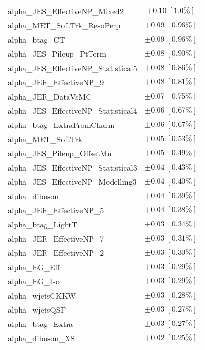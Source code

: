 \begin{table}
\begin{center}
\begin{tabular*}{\textwidth}{@{\extracolsep{\fill}}lc}
alpha\_JES\_EffectiveNP\_Mixed2         & $\pm 0.10\ [1.0\%] $       \\
alpha\_MET\_SoftTrk\_ResoPerp         & $\pm 0.09\ [0.96\%] $       \\
alpha\_btag\_CT         & $\pm 0.09\ [0.96\%] $       \\
alpha\_JES\_Pileup\_PtTerm         & $\pm 0.08\ [0.90\%] $       \\
alpha\_JES\_EffectiveNP\_Statistical5         & $\pm 0.08\ [0.86\%] $       \\
alpha\_JER\_EffectiveNP\_9         & $\pm 0.08\ [0.81\%] $       \\
alpha\_JER\_DataVsMC         & $\pm 0.07\ [0.75\%] $       \\
alpha\_JES\_EffectiveNP\_Statistical4         & $\pm 0.06\ [0.67\%] $       \\
alpha\_btag\_ExtraFromCharm         & $\pm 0.06\ [0.67\%] $       \\
alpha\_MET\_SoftTrk         & $\pm 0.05\ [0.53\%] $       \\
alpha\_JES\_Pileup\_OffsetMu         & $\pm 0.05\ [0.49\%] $       \\
alpha\_JES\_EffectiveNP\_Statistical3         & $\pm 0.04\ [0.43\%] $       \\
alpha\_JES\_EffectiveNP\_Modelling3         & $\pm 0.04\ [0.40\%] $       \\
alpha\_diboson         & $\pm 0.04\ [0.39\%] $       \\
alpha\_JER\_EffectiveNP\_5         & $\pm 0.04\ [0.38\%] $       \\
alpha\_btag\_LightT         & $\pm 0.03\ [0.34\%] $       \\
alpha\_JER\_EffectiveNP\_7         & $\pm 0.03\ [0.31\%] $       \\
alpha\_JER\_EffectiveNP\_2         & $\pm 0.03\ [0.30\%] $       \\
alpha\_EG\_Eff         & $\pm 0.03\ [0.29\%] $       \\
alpha\_EG\_Iso         & $\pm 0.03\ [0.29\%] $       \\
alpha\_wjetsCKKW         & $\pm 0.03\ [0.28\%] $       \\
alpha\_wjetsQSF         & $\pm 0.03\ [0.27\%] $       \\
alpha\_btag\_Extra         & $\pm 0.03\ [0.27\%] $       \\
alpha\_diboson\_XS         & $\pm 0.02\ [0.25\%] $       \\

\end{tabular*}
\end{center}
\end{table}
